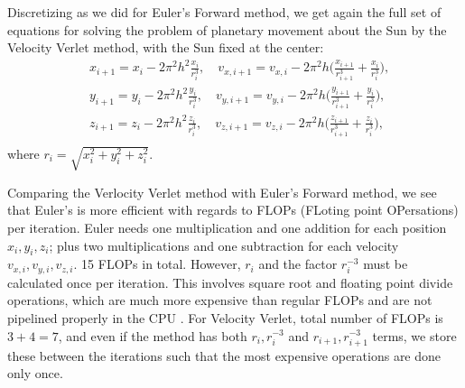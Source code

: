 \documentclass[]{article}
\begin{document}
Discretizing as we did for Euler's Forward method, we get again the full set of equations for solving the problem of planetary movement about the Sun by the Velocity Verlet method, with the Sun fixed at the center:
\begin{equation} \label{verlet}
\begin{aligned}
	&x_{i+1} = x_i - 2\pi^2h^2\frac{x_i}{r_i^3} , \quad v_{x,i+1} = v_{x,i} - 2\pi^2h \bigg(\frac{x_{i+1}}{r_{i+1}^3} + \frac{x_i}{r_i^3} \bigg) ,\\
	&y_{i+1} = y_i - 2\pi^2h^2\frac{y_i}{r_i^3} , \quad v_{y,i+1} = v_{y,i} - 2\pi^2h \bigg(\frac{y_{i+1}}{r_{i+1}^3} + \frac{y_i}{r_i^3} \bigg) ,\\
	&z_{i+1} = z_i - 2\pi^2h^2\frac{z_i}{r_i^3} , \quad v_{z,i+1} = v_{z,i} - 2\pi^2h \bigg(\frac{z_{i+1}}{r_{i+1}^3} + \frac{z_i}{r_i^3} \bigg) ,\\
\end{aligned}
\end{equation}
where $r_i = \sqrt{x_i^2 + y_i^2 + z_i^2}$.

Comparing the Verlocity Verlet method with Euler's Forward method, we see that Euler's is more efficient with regards to FLOPs (FLoting point OPersations) per iteration. Euler needs one multiplication and one addition for each position $x_i, y_i, z_i$; plus two multiplications and one subtraction for each velocity $v_{x,i}, v_{y,i}, v_{z,i}$. 15 FLOPs in total. However, $r_i$ and the factor $r_i^{-3}$ must be calculated once per iteration. This involves square root and floating point divide operations, which are much more expensive than regular FLOPs and are not pipelined properly in the CPU \cite{hager2010introduction}. For Velocity Verlet, total number of FLOPs is $3+4=7$, and even if the method has both $r_i, r_i^{-3}$ and $r_{i+1}, r_{i+1}^{-3}$ terms, we store these between the iterations such that the most expensive operations are done only once.
\end{document}
